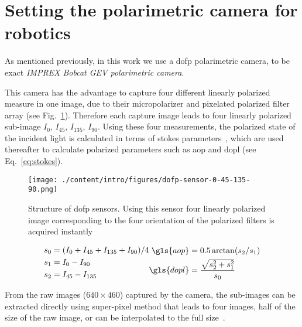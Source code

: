 \graphicspath{{./content/intro/figures/}}

\section{Setting the polarimetric camera for robotics}
\label{sec:rosify}
As mentioned previously, in this work we use a \gls{dofp} polarimetric camera,
to be exact \textit{IMPREX Bobcat GEV polarimetric camera}.

This camera has the advantage to capture four different linearly polarized
measure in one image, due to their micropolarizer and pixelated polarized
filter array (see Fig.~\ref{fig:dofp-sensor}).
Therefore each capture image leads to four linearly polarized sub-image $I_0$,
$I_{45}$, $I_{135}$, $I_{90}$.
Using these four measurements, the polarized state of the incident light is
calculated in terms of stokes parameters~\cite{goldstein2017polarized}, which
are used thereafter to calculate polarized parameters such as \gls{aop} and
\gls{dopl} (see Eq.~\ref{eq:stokes}).

\begin{figure}
  \centering
  \texttt{[image: ./content/intro/figures/dofp-sensor-0-45-135-90.png]}
  \label{fig:dofp-sensor}
  \caption{Structure of \gls{dofp} sensors. Using this sensor four linearly
    polarized image corresponding to the four orientation of the polarized
    filters is acquired instantly}
\end{figure}


\begin{subequations}
  \begin{align}
    s_0 & = (I_0 + I_{45} + I_{135} + I_{90})/4\\ \nonumber
    s_1 & = I_0 - I_{90} \\ \nonumber
    s_2 & = I_{45} - I_{135} \nonumber
  \end{align}
  \begin{align}
    \gls{aop} & = 0.5 \arctan(s_2/s_1) \\ \nonumber
    \gls{dopl} & = \frac{\sqrt{s_2^{2} + s_1^{2}}}{s_0} \nonumber
  \end{align}
  \label{eq:stokes}
\end{subequations}

From the raw images ($640\times460$) captured by the camera, the sub-images can
be extracted directly using super-pixel method that leads to four images, half
of the size of the raw image, or can be interpolated to the full
size~\cite{ratliff2009interpolationmicrogrid,gao2011bilinearpolarimeters}.

